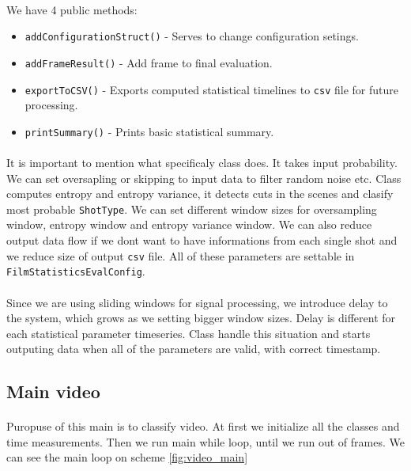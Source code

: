 \documentclass[english]{article}
\begin{document}
		\paragraph{}
			We have 4 public methods:
			\begin{itemize}
				\item \texttt{addConfigurationStruct()} - Serves to change configuration setings.
				\item \texttt{addFrameResult()} - Add frame to final evaluation.
				\item \texttt{exportToCSV()} - Exports computed statistical timelines to \texttt{csv} file for future processing.
				\item \texttt{printSummary()} - Prints basic statistical summary.
			\end{itemize}

		\paragraph{}
			It is important to mention what specificaly class does. It takes input probability. We can set oversapling or skipping to
			input data to filter random noise etc. Class computes entropy and entropy variance, it detects cuts in the scenes
			and clasify most probable \texttt{ShotType}. We can set different window sizes for oversampling window, entropy window and 
			entropy variance window. We can also reduce output data flow if we dont want to have informations from each single shot and we reduce size
			of output \texttt{csv} file. All of these parameters are settable in \texttt{FilmStatisticsEvalConfig}.
		\paragraph{}
			Since we are using sliding windows for signal processing, we introduce delay to the system, which grows as
			we setting bigger window sizes. Delay is different for each statistical parameter timeseries. Class handle this situation and starts
			outputing data when all of the parameters are valid, with correct timestamp.

	\subsection{Main video}
		\paragraph{}
			Puropuse of this main is to classify video. At first we initialize all the classes and time measurements.
			Then we run main while loop, until we run out of frames. We can see the main loop on scheme \ref{fig:video_main}
\end{document}
